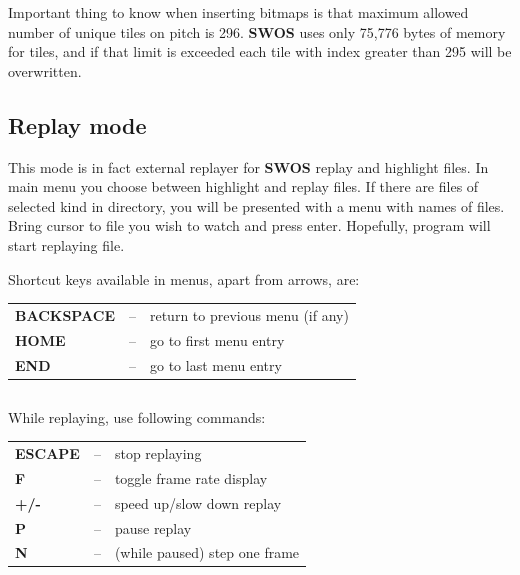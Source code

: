 \documentclass[a4paper,12pt]{article}
\begin{document}
Important thing to know when inserting bitmaps is that maximum allowed
number of unique tiles on pitch is 296. {\bf SWOS} uses only 75,776 bytes of
memory for tiles, and if that limit is exceeded each tile with index
greater than 295 will be overwritten.


\newpage
\subsection{Replay mode}

This mode is in fact external replayer for {\bf SWOS} replay and highlight files. In
main menu you choose between highlight and replay files. If there are files of
selected kind in directory, you will be presented with a menu with names of
files. Bring cursor to file you wish to watch and press enter. Hopefully,
program will start replaying file.

\vspace{\baselineskip}

Shortcut keys available in menus, apart from arrows, are:

\vspace{\baselineskip}

\begin{tabular}{lll}
{\bf BACKSPACE} &--& return to previous menu (if any)\\
{\bf HOME}      &--& go to first menu entry\\
{\bf END}       &--& go to last menu entry
\end{tabular}

\begin{verbatim}

\end{verbatim}

While replaying, use following commands:

\vspace{\baselineskip}

\begin{tabular}{lll}
{\bf ESCAPE} &--& stop replaying\\
{\bf F}      &--& toggle frame rate display\\
{\bf +/-}    &--& speed up/slow down replay\\
{\bf P}      &--& pause replay\\
{\bf N}      &--& (while paused) step one frame
\end{tabular}

\begin{verbatim}

\end{verbatim}
\end{document}
